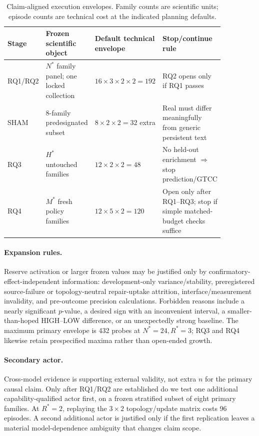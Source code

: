 \documentclass{article}
\begin{document}
\begin{table}[t]
\centering
\caption{Claim-aligned execution envelopes. Family counts are scientific units; episode counts are technical cost at the indicated planning defaults.}
\label{tab:matrix}
\small
\begin{tabular}{p{0.13\linewidth}p{0.27\linewidth}p{0.22\linewidth}p{0.24\linewidth}}
\toprule
Stage & Frozen scientific object & Default technical envelope & Stop/continue rule \\
\midrule
RQ1/RQ2 & $N^*$ family panel; one locked collection & $16\times3\times2\times2=192$ & RQ2 opens only if RQ1 passes \\
SHAM & 8-family predesignated subset & $8\times2\times2=32$ extra & Real must differ meaningfully from generic persistent text \\
RQ3 & $H^*$ untouched families & $12\times2\times2=48$ & No held-out enrichment $\Rightarrow$ stop prediction/GTCC \\
RQ4 & $M^*$ fresh policy families & $12\times5\times2=120$ & Open only after RQ1--RQ3; stop if simple matched-budget checks suffice \\
\bottomrule
\end{tabular}
\end{table}

\paragraph{Expansion rules.}
Reserve activation or larger frozen values may be justified only by confirmatory-effect-independent information: development-only variance/stability, preregistered source-failure or topology-neutral repair-uptake attrition, interface/measurement invalidity, and pre-outcome precision calculations. Forbidden reasons include a nearly significant $p$-value, a desired sign with an inconvenient interval, a smaller-than-hoped HIGH--LOW difference, or an unexpectedly strong baseline. The maximum primary envelope is 432 probes at $N^*=24,R^*=3$; RQ3 and RQ4 likewise retain prespecified maxima rather than open-ended growth.

\paragraph{Secondary actor.}
Cross-model evidence is supporting external validity, not extra $n$ for the primary causal claim. Only after RQ1/RQ2 are established do we test one additional capability-qualified actor first, on a frozen stratified subset of eight primary families. At $R^*=2$, replaying the $3\times2$ topology/update matrix costs 96 episodes. A second additional actor is justified only if the first replication leaves a material model-dependence ambiguity that changes claim scope.
\end{document}
